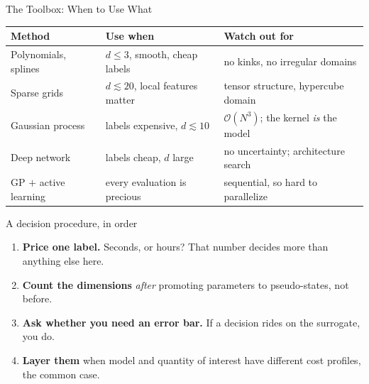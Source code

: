 \documentclass[aspectratio=169,11pt]{beamer}
\newcommand{\emphc}[1]{\textcolor{harvardcrimson}{#1}}
\begin{document}
\begin{frame}{The Toolbox: When to Use What}
\begin{center}
\footnotesize
\begin{tabular}{l l l}
\toprule
\textbf{Method} & \textbf{Use when} & \textbf{Watch out for} \\
\midrule
Polynomials, splines & $d \le 3$, smooth, cheap labels & no kinks, no irregular domains \\
Sparse grids & $d \lesssim 20$, local features matter & tensor structure, hypercube domain \\
\emphc{Gaussian process} & \emphc{labels expensive}, $d \lesssim 10$ & $\mathcal{O}(N^3)$; the kernel \emph{is} the model \\
\emphc{Deep network} & \emphc{labels cheap}, $d$ large & no uncertainty; architecture search \\
GP $+$ active learning & every evaluation is precious & sequential, so hard to parallelize \\
\bottomrule
\end{tabular}
\end{center}

\vspace{0.2cm}
\begin{block}{A decision procedure, in order}
\small
\begin{enumerate}\itemsep1pt
  \item \textbf{Price one label.} Seconds, or hours? That number decides more than anything else here.
  \item \textbf{Count the dimensions} \emph{after} promoting parameters to pseudo-states, not before.
  \item \textbf{Ask whether you need an error bar.} If a decision rides on the surrogate, you do.
  \item \textbf{Layer them} when model and quantity of interest have different cost profiles, the common case.
\end{enumerate}
\end{block}
\end{frame}
\end{document}
